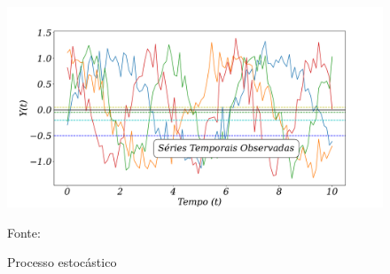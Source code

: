\begin{figure}[H]
	\centering
	\caption{Processo estocástico}
	\label{fig:serie}
	\includegraphics[width=0.9\linewidth]{Revisao/Figuras/serie}
	
	Fonte: \cite{pinheiro_2022}
\end{figure}